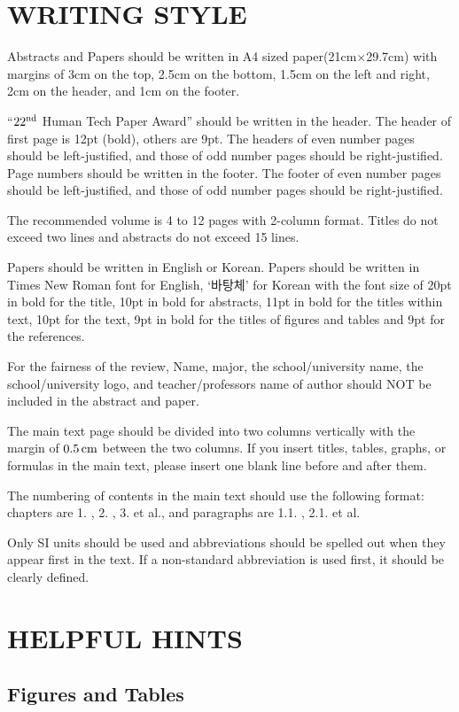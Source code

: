 \documentclass{fullpaper_hutech_v1.02}
\begin{document}
\section{WRITING STYLE}
Abstracts and Papers should be written in A4 sized paper(21cm$\times$29.7cm) with margins of 3cm on the top, 2.5cm on the bottom, 1.5cm on the left and right, 2cm on the header, and 1cm on the footer.

``$22^{\rm nd}$ Human Tech Paper Award'' should be written in the header. The header of first page is 12pt (bold), others are 9pt. The headers of even number pages should be left-justified, and those of odd number pages should be right-justified. Page numbers should be written in the footer. The footer of even number pages should be left-justified, and those of odd number pages should be right-justified.

The recommended volume is 4 to 12 pages with 2-column format. Titles do not exceed two lines and abstracts do not exceed 15 lines.

Papers should be written in English or Korean. Papers should be written in Times New Roman font for English, `바탕체' for Korean with the font size of 20pt in bold for the title, 10pt in bold for abstracts, 11pt in bold for the titles within text, 10pt for the text, 9pt in bold for the titles of figures and tables and 9pt for the references.

For the fairness of the review, Name, major, the school/university name, the school/university logo, and teacher/professors name of author should NOT be included in the abstract and paper. 

The main text page should be divided into two columns vertically with the margin of $0.5\,\rm cm$ between the two columns. If you insert titles, tables, graphs, or formulas in the main text, please insert one blank line before and after them.

The numbering of contents in the main text should use the following format: chapters are 1. , 2. , 3. et al., and paragraphs are 1.1. , 2.1. et al.

Only SI units should be used and abbreviations should be spelled out when they appear first in the text. If a non-standard abbreviation is used first, it should be clearly defined.

\section{HELPFUL HINTS}

\subsection{Figures and Tables}
\end{document}
